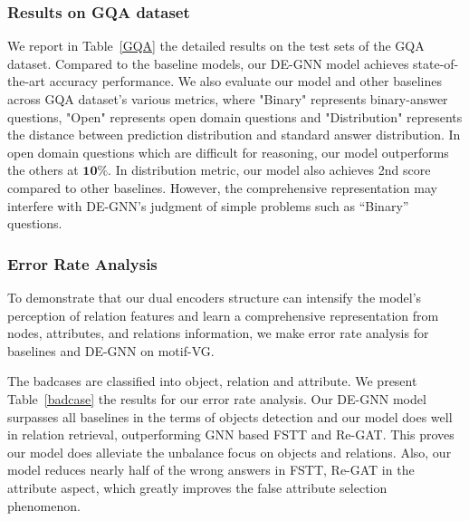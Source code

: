 \documentclass[letterpaper]{article} %
\begin{document}
\subsubsection{Results on GQA dataset}We report in Table~\ref{GQA} the detailed results on the test sets of the GQA dataset. Compared to the baseline models, our DE-GNN model achieves state-of-the-art accuracy performance. We also evaluate our model and other baselines across GQA dataset's various metrics, where "Binary" represents binary-answer questions, "Open" represents open domain questions and "Distribution" represents the distance between prediction distribution and standard answer distribution. In open domain questions which are difficult for reasoning, our model outperforms the others at $\textbf{10\%}$. In distribution metric, our model also achieves 2nd score compared to other baselines. However, the comprehensive representation may interfere with DE-GNN's judgment of simple problems such as ``Binary'' questions.

\subsubsection{Error Rate Analysis} To demonstrate that our dual encoders structure can intensify the model's perception of relation features and learn a comprehensive representation from nodes, attributes, and relations information, we make error rate analysis for baselines and DE-GNN on motif-VG.

The badcases are classified into object, relation and attribute. We present Table~\ref{badcase} the results for our error rate analysis. Our DE-GNN model surpasses all baselines in the terms of objects detection and our model does well in relation retrieval, outperforming GNN based FSTT and Re-GAT. This proves our model does alleviate the unbalance focus on objects and relations.
Also, our model reduces nearly half of the wrong answers in FSTT, Re-GAT in the attribute aspect, which greatly improves the false attribute selection phenomenon.
\end{document}
